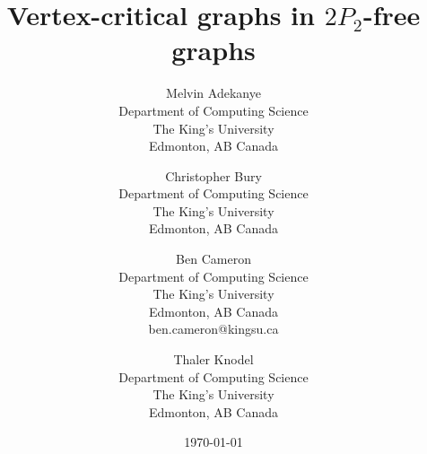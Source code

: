 \documentclass[11pt]{article}
\theoremstyle{definition}
\begin{document}
\title{Vertex-critical graphs in $2P_2$-free graphs}
\author{
Melvin Adekanye\\
\small Department of Computing Science\\
\small The King's University\\
\small Edmonton, AB Canada\\
\and
Christopher Bury\\ %
\small Department of Computing Science\\
\small The King's University\\
\small Edmonton, AB Canada\\
\and
Ben Cameron\\ %
\small Department of Computing Science\\
\small The King's University\\
\small Edmonton, AB Canada\\
\small ben.cameron@kingsu.ca\\
\and
Thaler Knodel\\ 
\small Department of Computing Science\\
\small The King's University\\
\small Edmonton, AB Canada
}

\date{\today}

\maketitle


\begin{abstract}
\end{abstract}
\end{document}
